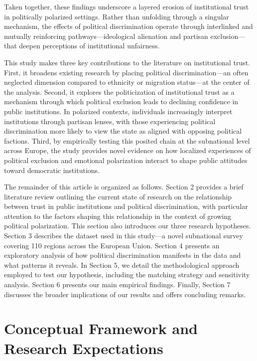 \documentclass{article}
\begin{document}
Taken together, these findings underscore a layered erosion of institutional trust in politically polarized settings. Rather than unfolding through a singular mechanism, the effects of political discrimination operate through interlinked and mutually reinforcing pathways—ideological alienation and partisan exclusion—that deepen perceptions of institutional unfairness.

This study makes three key contributions to the literature on institutional trust. First, it broadens existing research by placing political discrimination—an often neglected dimension compared to ethnicity or migration status—at the center of the analysis. Second, it explores the politicization of institutional trust as a mechanism through which political exclusion leads to declining confidence in public institutions. In polarized contexts, individuals increasingly interpret institutions through partisan lenses, with those experiencing political discrimination more likely to view the state as aligned with opposing political factions. Third, by empirically testing this posited chain at the subnational level across Europe, the study provides novel evidence on how localized experiences of political exclusion and emotional polarization interact to shape public attitudes toward democratic institutions.

The remainder of this article is organized as follows. Section 2 provides a brief literature review outlining the current state of research on the relationship between trust in public institutions and political discrimination, with particular attention to the factors shaping this relationship in the context of growing political polarization. This section also introduces our three research hypotheses. Section 3 describes the dataset used in this study—a novel subnational survey covering 110 regions across the European Union. Section 4 presents an exploratory analysis of how political discrimination manifests in the data and what patterns it reveals. In Section 5, we detail the methodological approach employed to test our hypothesis, including the matching strategy and sensitivity analysis. Section 6 presents our main empirical findings. Finally, Section 7 discusses the broader implications of our results and offers concluding remarks.

\section{Conceptual Framework and Research Expectations}
\end{document}
